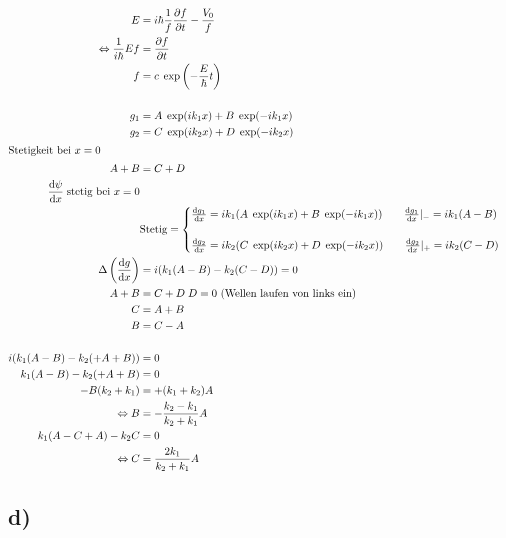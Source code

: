     \begin{align*}
        E &= i\hbar \frac{1}{f} \frac{\partial f}{\partial t} - \frac{V_0}{f}\\
        \Leftrightarrow \frac{1}{i\hbar} Ef &= \frac{\partial f}{\partial t}\\
        f &= c \; \exp \left( -\frac{E}{\hbar}t \right)\\
        \\
        g_1 &= A \; \exp(ik_1x) + B \; \exp(-ik_1x)\\
        g_2 &= C \; \exp(ik_2x) + D \; \exp(-ik_2x)\\
        \intertext{Stetigkeit bei $x=0$
        }
        A + B &= C + D\\
        \frac{\mathrm{d}\psi}{\mathrm{d}x} \; \text{stetig bei $x=0$}\\
        &\text{Stetig}=\begin{cases}
            \frac{\mathrm{d} g_1}{\mathrm{d}x} = ik_1 (A\;\exp(ik_1x) + B\;\exp(-ik_1x)) \qquad \frac{\mathrm{d} g_1}{\mathrm{d}x} \vert_{-} = ik_1(A-B)\\
            \\
            \frac{\mathrm{d} g_2}{\mathrm{d}x} = ik_2 (C\;\exp(ik_2x) + D\;\exp(-ik_2x)) \qquad \frac{\mathrm{d} g_2}{\mathrm{d}x} \vert_{+} = ik_2(C-D)
        \end{cases}\\
        \Delta \left( \frac{\mathrm{d} g}{\mathrm{d}x} \right) &= i(k_1(A-B) -k_2(C-D)) =0\\
        A+B &= C+D \; \text{$D=0$ (Wellen laufen von links ein)}\\
        C &= A+B\\
        B &= C-A\\
        \\
        i(k_1(A-B) - k_2(+A+B)) &=0\\
        k_1(A-B) - k_2(+A+B) &=0\\
        -B(k_2+k_1) &= +(k_1+k_2)A\\
        \Leftrightarrow B &= -\frac{k_2-k_1}{k_2+k_1}A\\
        k_1(A-C+A)-k_2C &= 0\\
        \Leftrightarrow C &= \frac{2k_1}{k_2+k_1}A
    \end{align*}

\subsection{d)}

